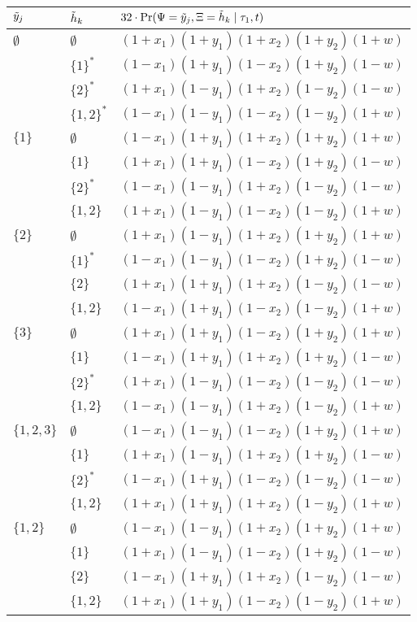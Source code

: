 \begin{table}
\centering
\begin{tabular}{|l|ll|}
\hline
$\tilde{y}_j$ & $\tilde{h}_k$ & $32\cdot\Pr(\Psi=\tilde{y}_j, \Xi=\tilde{h}_k \mid \tau_1, t)$\\
\hline
$\emptyset$&$\emptyset$&$(1+x_1)(1+y_1)(1+x_2)(1+y_2)(1+w)$\\
&$\{1\}^*$&$(1-x_1)(1+y_1)(1-x_2)(1+y_2)(1-w)$             \\
&$\{2\}^*$&$(1+x_1)(1-y_1)(1+x_2)(1-y_2)(1-w)$             \\
&$\{1,2\}^*$&$(1-x_1)(1-y_1)(1-x_2)(1-y_2)(1+w)$           \\

$\{1\}$    &$\emptyset$&$(1-x_1)(1+y_1)(1+x_2)(1+y_2)(1+w)$\\
&$\{1\}$&$(1+x_1)(1+y_1)(1-x_2)(1+y_2)(1-w)$               \\
&$\{2\}^*$&$(1-x_1)(1-y_1)(1+x_2)(1-y_2)(1-w)$             \\
&$\{1,2\}$&$(1+x_1)(1-y_1)(1-x_2)(1-y_2)(1+w)$             \\

$\{2\}$    &$\emptyset$&$(1+x_1)(1-y_1)(1+x_2)(1+y_2)(1+w)$\\
&$\{1\}^*$&$(1-x_1)(1-y_1)(1-x_2)(1+y_2)(1-w)$             \\
&$\{2\}$&$(1+x_1)(1+y_1)(1+x_2)(1-y_2)(1-w)$               \\
&$\{1,2\}$&$(1-x_1)(1+y_1)(1-x_2)(1-y_2)(1+w)$             \\

$\{3\}$    &$\emptyset$&$(1+x_1)(1+y_1)(1-x_2)(1+y_2)(1+w)$\\
&$\{1\}$&$(1-x_1)(1+y_1)(1+x_2)(1+y_2)(1-w)$               \\
&$\{2\}^*$&$(1+x_1)(1-y_1)(1-x_2)(1-y_2)(1-w)$             \\
&$\{1,2\}$&$(1-x_1)(1-y_1)(1+x_2)(1-y_2)(1+w)$             \\

$\{1,2,3\}$&$\emptyset$&$(1-x_1)(1-y_1)(1-x_2)(1+y_2)(1+w)$\\
&$\{1\}$&$(1+x_1)(1-y_1)(1+x_2)(1+y_2)(1-w)$               \\
&$\{2\}^*$&$(1-x_1)(1+y_1)(1-x_2)(1-y_2)(1-w)$             \\
&$\{1,2\}$&$(1+x_1)(1+y_1)(1+x_2)(1-y_2)(1+w)$             \\

$\{1,2\}$  &$\emptyset$&$(1-x_1)(1-y_1)(1+x_2)(1+y_2)(1+w)$\\
&$\{1\}$&$(1+x_1)(1-y_1)(1-x_2)(1+y_2)(1-w)$               \\
&$\{2\}$&$(1-x_1)(1+y_1)(1+x_2)(1-y_2)(1-w)$               \\
&$\{1,2\}$&$(1+x_1)(1+y_1)(1-x_2)(1-y_2)(1+w)$             \\


\end{tabular}
\end{table}
